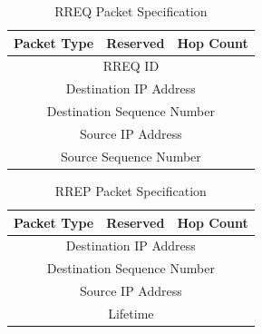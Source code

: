 \documentclass[conference]{IEEEtran}
\begin{document}
\begin{table}[h!]
  \begin{minipage}[t]{.45\textwidth}
    \begin{center}
        \caption{RREQ Packet Specification}
        \label{tab:rreqTable}
\begin{tabular}{|c|c|c|}
\hline
Packet Type & Reserved & Hop Count \\
\hline
\multicolumn{3}{|c|}{RREQ ID} \\
\hline
\multicolumn{3}{|c|}{Destination IP Address} \\
\hline
\multicolumn{3}{|c|}{Destination Sequence Number} \\
\hline
\multicolumn{3}{|c|}{Source IP Address} \\
\hline
\multicolumn{3}{|c|}{Source Sequence Number} \\
\hline
\end{tabular}
    \end{center}

  \end{minipage}
  \end{table}
  
  \begin{table}[h!]
  \begin{minipage}[t]{.45\textwidth}
    \begin{center}
        \caption{RREP Packet Specification}
        \label{tab:rrepTable}
\begin{tabular}{|c|c|c|}
\hline
Packet Type & Reserved & Hop Count \\
\hline
\multicolumn{3}{|c|}{Destination IP Address} \\
\hline
\multicolumn{3}{|c|}{Destination Sequence Number} \\
\hline
\multicolumn{3}{|c|}{Source IP Address} \\
\hline
\multicolumn{3}{|c|}{Lifetime} \\
\hline
\end{tabular}
    \end{center}

  \end{minipage}
  \end{table}
  
\end{document}
